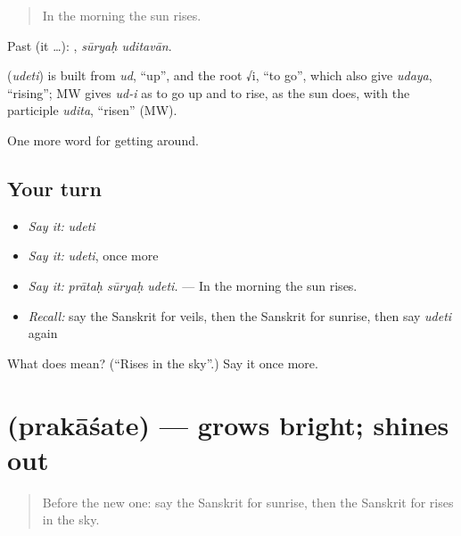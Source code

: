 \begin{quote}
In the morning the sun rises.
\end{quote}

Past (it …):  , \emph{sūryaḥ uditavān}.

\begin{cousinweb}
\textbf{} (\emph{udeti}) is built from \emph{ud}, \textquotedblleft{}up\textquotedblright{}, and the root √i, \textquotedblleft{}to go\textquotedblright{}, which also give \emph{udaya}, \textquotedblleft{}rising\textquotedblright{}; MW gives \emph{ud-i} as to go up and to rise, as the sun does, with the participle \emph{udita}, \textquotedblleft{}risen\textquotedblright{} (MW).
\end{cousinweb}

\begin{grammarlens}[title={What you've built}]
One more word for getting around.
\end{grammarlens}

\subsection*{Your turn}
\begin{itemize}
\raggedright
  \item \emph{Say it:} \emph{udeti}
  \item \emph{Say it:} \emph{udeti}, once more
  \item \emph{Say it:} \emph{prātaḥ sūryaḥ udeti.} — In the morning the sun rises.
  \item \emph{Recall:} say the Sanskrit for veils, then the Sanskrit for sunrise, then say \emph{udeti} again
\end{itemize}

\begin{tcolorbox}[breakable,colback=teal!4,colframe=teal!35!black,title={Before you move on}]
What does  mean? (\textquotedblleft{}Rises in the sky\textquotedblright{}.) Say it once more.
\end{tcolorbox}
\section[\texorpdfstring{\sk{प्रकाशते} (prakāśate)}{प्रकाशते (prakāśate)}]{ (prakāśate) — grows bright; shines out}

\label{lesson:SA-C442-prakasate}



\begin{quote}
Before the new one: say the Sanskrit for sunrise, then the Sanskrit for rises in the sky.
\end{quote}

